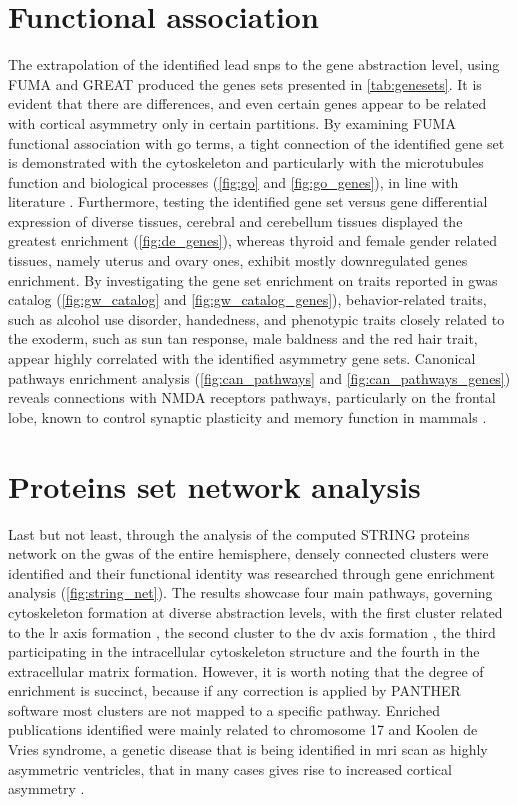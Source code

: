 \section{Functional association}
\label{sec:res_functional}
The extrapolation of the identified lead \acp{snp} to the gene abstraction level, using FUMA and GREAT produced the genes sets presented in \autoref{tab:genesets}. It is evident that there are differences, and even certain genes appear to be related with cortical asymmetry only in certain partitions. By examining FUMA functional association with \ac{go} terms, a tight connection of the identified gene set is demonstrated with the cytoskeleton and particularly with the microtubules function and biological processes (\autoref{fig:go} and \ref{fig:go_genes}), in line with literature \cite{Sha2021}. Furthermore, testing the identified gene set versus gene differential expression of diverse tissues, cerebral and cerebellum tissues displayed the greatest enrichment (\autoref{fig:de_genes}), whereas thyroid and female gender related tissues, namely uterus and ovary ones, exhibit mostly downregulated genes enrichment. By investigating the gene set enrichment on traits reported in \ac{gwas} catalog (\autoref{fig:gw_catalog} and \ref{fig:gw_catalog_genes}), behavior-related traits, such as alcohol use disorder, handedness, and phenotypic traits closely related to the exoderm, such as sun tan response, male baldness and the red hair trait, appear highly correlated with the identified asymmetry gene sets. Canonical pathways enrichment analysis (\autoref{fig:can_pathways} and \ref{fig:can_pathways_genes}) reveals connections with NMDA receptors pathways, particularly on the frontal lobe,  known to control synaptic plasticity and memory function in mammals \cite{Li2009}.

\section{Proteins set network analysis}

Last but not least, through the analysis of the computed STRING proteins network on the \ac{gwas} of the entire hemisphere, densely connected clusters were identified and their functional identity was researched through gene enrichment analysis (\autoref{fig:string_net}). The results showcase four main pathways, governing cytoskeleton formation at diverse abstraction levels, with the first cluster related to the \ac{lr} axis formation \cite{Hu2017}, the second cluster to the \ac{dv} axis formation \cite{Hikasa2013}, the third participating in the intracellular cytoskeleton structure and the fourth in the extracellular matrix formation. However, it is worth noting that the degree of enrichment is succinct, because if any correction is applied by PANTHER software most clusters are not mapped to a specific pathway. Enriched publications identified were mainly related to chromosome 17 and Koolen de Vries syndrome, a genetic disease that is being identified in \ac{mri} scan as highly asymmetric ventricles, that in many cases gives rise to increased cortical asymmetry \cite{Myers2017}.


